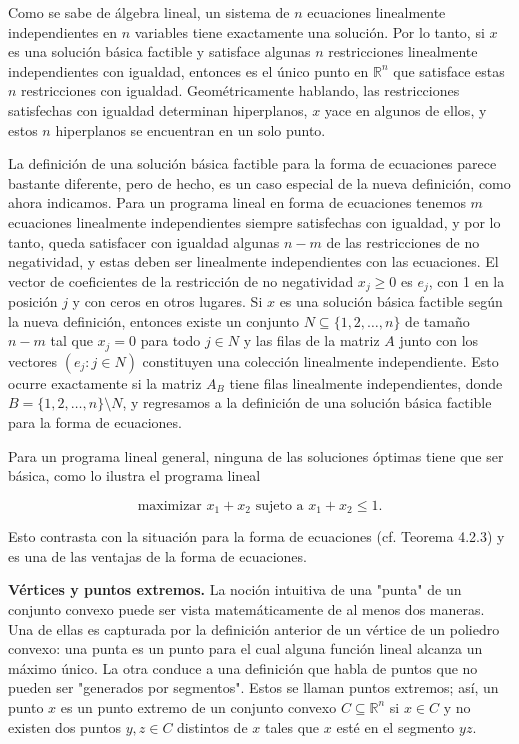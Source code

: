 \documentclass{article}
\begin{document}
Como se sabe de álgebra lineal, un sistema de \( n \) ecuaciones linealmente independientes en \( n \) variables tiene exactamente una solución. Por lo tanto, si \( x \) es una solución básica factible y satisface algunas \( n \) restricciones linealmente independientes con igualdad, entonces es el único punto en \( \mathbb{R}^n \) que satisface estas \( n \) restricciones con igualdad. Geométricamente hablando, las restricciones satisfechas con igualdad determinan hiperplanos, \( x \) yace en algunos de ellos, y estos \( n \) hiperplanos se encuentran en un solo punto.

La definición de una solución básica factible para la forma de ecuaciones parece bastante diferente, pero de hecho, es un caso especial de la nueva definición, como ahora indicamos. Para un programa lineal en forma de ecuaciones tenemos \( m \) ecuaciones linealmente independientes siempre satisfechas con igualdad, y por lo tanto, queda satisfacer con igualdad algunas \( n - m \) de las restricciones de no negatividad, y estas deben ser linealmente independientes con las ecuaciones. El vector de coeficientes de la restricción de no negatividad \( x_j \geq 0 \) es \( e_j \), con 1 en la posición \( j \) y con ceros en otros lugares. Si \( x \) es una solución básica factible según la nueva definición, entonces existe un conjunto \( N \subseteq \{1, 2, \ldots, n\} \) de tamaño \( n - m \) tal que \( x_j = 0 \) para todo \( j \in N \) y las filas de la matriz \( A \) junto con los vectores \( (e_j : j \in N) \) constituyen una colección linealmente independiente. Esto ocurre exactamente si la matriz \( A_B \) tiene filas linealmente independientes, donde \( B = \{1, 2, \ldots, n\} \setminus N \), y regresamos a la definición de una solución básica factible para la forma de ecuaciones.

Para un programa lineal general, ninguna de las soluciones óptimas tiene que ser básica, como lo ilustra el programa lineal 

\[
\text{maximizar } x_1 + x_2 \text{ sujeto a } x_1 + x_2 \leq 1.
\]

Esto contrasta con la situación para la forma de ecuaciones (cf. Teorema 4.2.3) y es una de las ventajas de la forma de ecuaciones.

\textbf{Vértices y puntos extremos.} La noción intuitiva de una "punta" de un conjunto convexo puede ser vista matemáticamente de al menos dos maneras. Una de ellas es capturada por la definición anterior de un vértice de un poliedro convexo: una punta es un punto para el cual alguna función lineal alcanza un máximo único. La otra conduce a una definición que habla de puntos que no pueden ser "generados por segmentos". Estos se llaman puntos extremos; así, un punto \( x \) es un punto extremo de un conjunto convexo \( C \subseteq \mathbb{R}^n \) si \( x \in C \) y no existen dos puntos \( y, z \in C \) distintos de \( x \) tales que \( x \) esté en el segmento \( yz \).
\end{document}
